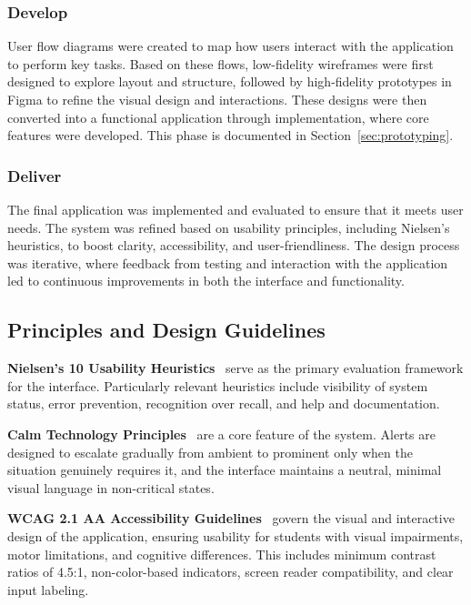 \documentclass[sigconf]{acmart}
\begin{document}
\subsubsection{Develop}
User flow diagrams were created to map how users interact with the application to perform key tasks. Based on these flows, low-fidelity wireframes were first designed to explore layout and structure, followed by high-fidelity prototypes in Figma to refine the visual design and interactions. These designs were then converted into a functional application through implementation, where core features were developed. This phase is documented in Section~\ref{sec:prototyping}.
 
\subsubsection{Deliver}
The final application was implemented and evaluated to ensure that it meets user needs. The system was refined based on usability principles, including Nielsen's heuristics, to boost clarity, accessibility, and user-friendliness. The design process was iterative, where feedback from testing and interaction with the application led to continuous improvements in both the interface and functionality.
 
\subsection{Principles and Design Guidelines}
\label{sec:guidelines}
 
\textbf{Nielsen's 10 Usability Heuristics}~\cite{nielsen1994usability} serve as the primary evaluation framework for the interface. Particularly relevant heuristics include visibility of system status, error prevention, recognition over recall, and help and documentation.
 
\textbf{Calm Technology Principles}~\cite{weiser1996calm} are a core feature of the system. Alerts are designed to escalate gradually from ambient to prominent only when the situation genuinely requires it, and the interface maintains a neutral, minimal visual language in non-critical states.
 
\textbf{WCAG 2.1 AA Accessibility Guidelines}~\cite{wcag21} govern the visual and interactive design of the application, ensuring usability for students with visual impairments, motor limitations, and cognitive differences. This includes minimum contrast ratios of 4.5:1, non-color-based indicators, screen reader compatibility, and clear input labeling.
 
\end{document}
